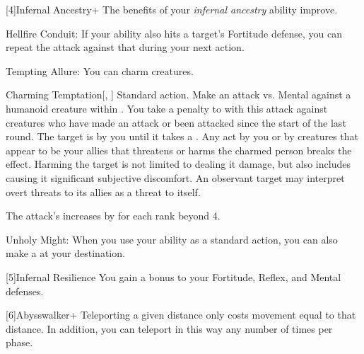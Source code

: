     [4]{Infernal Ancestry+} The benefits of your \textit{infernal ancestry} ability improve.
      \begin{raggeditemize}
        \item Hellfire Conduit: If your  ability also hits a target's Fortitude defense, you can repeat the attack against that during your next action.
        \item Tempting Allure: You can charm creatures.
          \begin{magicalactiveability}{Charming Temptation}[, ]
            \abilityusagetime Standard action.
            \rankline
            Make an attack vs. Mental against a humanoid creature within \medrange.
            You take a  penalty to  with this attack against creatures who have made an attack or been attacked since the start of the last round.
            \hit The target is \charmed by you until it takes a .
            Any act by you or by creatures that appear to be your allies that threatens or harms the charmed person breaks the effect.
            Harming the target is not limited to dealing it damage, but also includes causing it significant subjective discomfort.
            An observant target may interpret overt threats to its allies as a threat to itself.

            \rankline
            The attack's  increases by  for each rank beyond 4.
          \end{magicalactiveability}
        \item Unholy Might: When you use your  ability as a standard action, you can also make a   at your destination.
      \end{raggeditemize}

    [5]{Infernal Resilience} You gain a  bonus to your Fortitude, Reflex, and Mental defenses.

    [6]{Abysswalker+} Teleporting a given distance only costs movement equal to that distance.
    In addition, you can teleport in this way any number of times per phase.

